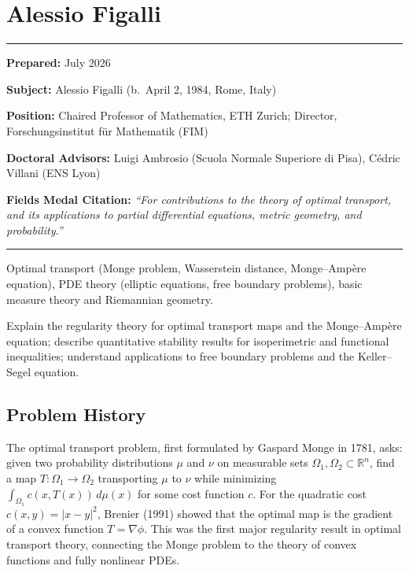 \chapter{Alessio Figalli}\label{ch2018alessiofigalli:alessio-figalli-fields-medal-2018-a-comprehensive-report-on-his-work-and-impact}

\begin{center}\rule{0.5\linewidth}{0.5pt}\end{center}

\textbf{Prepared:} July 2026

\textbf{Subject:} Alessio Figalli (b.\ April 2, 1984, Rome, Italy)

\textbf{Position:} Chaired Professor of Mathematics, ETH Zurich; Director, Forschungsinstitut f\"ur Mathematik (FIM)

\textbf{Doctoral Advisors:} Luigi Ambrosio (Scuola Normale Superiore di Pisa), C\'edric Villani (ENS Lyon)

\textbf{Fields Medal Citation:} \emph{``For contributions to the theory of optimal transport, and its applications to partial differential equations, metric geometry, and probability.''}

\begin{center}\rule{0.5\linewidth}{0.5pt}\end{center}

\begin{prereqs}
Optimal transport (Monge problem, Wasserstein distance, Monge--Amp\`ere equation), PDE theory (elliptic equations, free boundary problems), basic measure theory and Riemannian geometry.
\end{prereqs}

\begin{objectives}
Explain the regularity theory \cite{figalli2016} for optimal transport maps and the Monge--Amp\`ere equation; describe quantitative stability results for isoperimetric and functional inequalities; understand applications to free boundary problems and the Keller--Segel equation.
\end{objectives}

\section{Problem History}

The optimal transport problem, first formulated by Gaspard Monge in 1781, asks: given two probability distributions $\mu$ and $\nu$ on measurable sets $\Omega_1, \Omega_2 \subset \mathbb{R}^n$, find a map $T: \Omega_1 \to \Omega_2$ transporting $\mu$ to $\nu$ while minimizing $\int_{\Omega_1} c(x, T(x))\,d\mu(x)$ for some cost function $c$. For the quadratic cost $c(x,y) = |x-y|^2$, Brenier (1991) showed that the optimal map is the gradient of a convex function $T = \nabla\phi$. This was the first major regularity result in optimal transport theory, connecting the Monge problem to the theory of convex functions and fully nonlinear PDEs.

